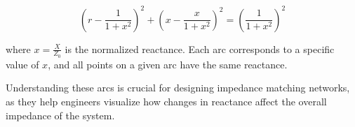 \[
\left( r - \frac{1}{1 + x^2} \right)^2 + \left( x - \frac{x}{1 + x^2} \right)^2 = \left( \frac{1}{1 + x^2} \right)^2
\]

where \( x = \frac{X}{Z_0} \) is the normalized reactance. Each arc corresponds to a specific value of \( x \), and all points on a given arc have the same reactance.

Understanding these arcs is crucial for designing impedance matching networks, as they help engineers visualize how changes in reactance affect the overall impedance of the system.

